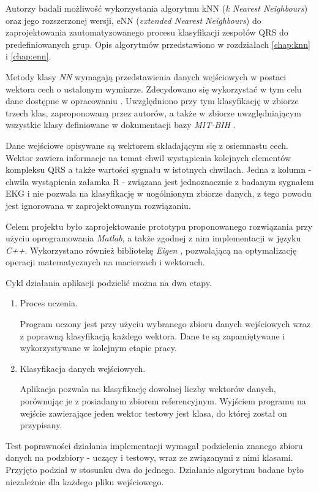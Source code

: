 Autorzy badali możliwość wykorzystania algorytmu kNN (\textit{k Nearest Neighbours}) oraz jego rozszerzonej wersji, eNN (\textit{extended Nearest Neighbours}) do zaprojektowania zautomatyzowanego procesu klasyfikacji zespołów QRS do predefiniowanych grup. Opis algorytmów przedstawiono w rozdziałach \ref{chap:knn} i \ref{chap:enn}.

Metody klasy \textit{NN} wymagają przedstawienia danych wejściowych w postaci wektora cech o ustalonym wymiarze. Zdecydowano się wykorzystać w tym celu dane dostępne w opracowaniu \cite{heart-class-module}. Uwzględniono przy tym klasyfikację w zbiorze trzech klas, zaproponowaną przez autorów, a także w zbiorze uwzględniającym wszystkie klasy definiowane w dokumentacji bazy \textit{MIT-BIH} \cite{mitdb}.

Dane wejściowe opisywane są wektorem składającym się z osiemnastu cech. Wektor zawiera informacje na temat chwil wystąpienia kolejnych elementów kompleksu QRS a także wartości sygnału w istotnych chwilach. Jedna z kolumn - chwila wystąpienia załamka R - związana jest jednoznacznie z badanym sygnałem EKG i nie pozwala na klasyfikację w uogólnionym zbiorze danych, z tego powodu jest ignorowana w zaprojektowanym rozwiązaniu.

Celem projektu było zaprojektowanie prototypu proponowanego rozwiązania przy użyciu oprogramowania \textit{Matlab}, a także zgodnej z nim implementacji w języku \textit{C++}. Wykorzystano również bibliotekę \textit{Eigen} \cite{eigen-www}, pozwalającą na optymalizację operacji matematycznych na macierzach i wektorach.

Cykl działania aplikacji podzielić można na dwa etapy.
\begin{enumerate}
	\item Proces uczenia.
	
	Program uczony jest przy użyciu wybranego zbioru danych wejściowych wraz z poprawną klasyfikacją każdego wektora. Dane te są zapamiętywane i wykorzystywane w kolejnym etapie pracy.
	
	\item
	Klasyfikacja danych wejściowych.
	
	Aplikacja pozwala na klasyfikację dowolnej liczby wektorów danych, porównując je z posiadanym zbiorem referencyjnym. Wyjściem programu na wejście zawierające jeden wektor testowy jest klasa, do której został on przypisany.
\end{enumerate}

Test poprawności działania implementacji wymagał podzielenia znanego zbioru danych na podzbiory - uczący i testowy, wraz ze związanymi z nimi klasami. Przyjęto podział w stosunku dwa do jednego. Działanie algorytmu badane było niezależnie dla każdego pliku wejściowego.

